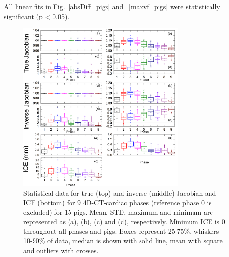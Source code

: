 All linear fits in Fig.~\ref{absDiff_pigs} and ~\ref{maxvf_pigs} were statistically significant (p < 0.05).



\newpage

\begin{figure}[H]
	\begin{center}		
		\includegraphics[width=0.75\textwidth]{./VisualMotionManagment/Images/Jacobian_data_pigs.png}
		\caption{Statistical data for true (top) and inverse (middle) Jacobian and ICE (bottom) for 9 4D-CT-cardiac phases (reference phase 0 is excluded) for 15 pigs. Mean, STD, maximum and minimum are represented as (a), (b), (c) and (d), respectively.
		Minimum ICE is 0 throughout all phases and pigs. Boxes represent 25-75\%, whiskers 10-90\% of data, median is shown with solid line, mean with square and outliers with crosses.}
		\label{jacobian_data_pigs}
	\end{center}
\end{figure}

\newpage


